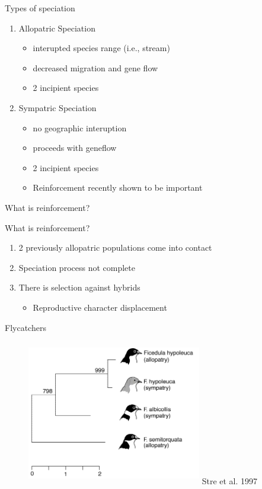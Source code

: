 \documentclass[t,10pt]{beamer}
\begin{document}
\begin{frame}[label={sec:orgheadline17}]{Types of speciation}
\begin{enumerate}
\item Allopatric Speciation
\begin{itemize}
\item interupted species range (i.e., stream)
\item decreased migration and gene flow
\item 2 incipient species \vspace{0.25in}
\end{itemize}
\item Sympatric Speciation
\begin{itemize}
\item no geographic interuption
\item proceeds with geneflow
\item 2 incipient species
\item<2-> \alert{Reinforcement recently shown to be important} \vspace{0.25in}
\end{itemize}
\end{enumerate}
\end{frame}

\begin{frame}[label={sec:orgheadline18}]{What is reinforcement?}
\end{frame}
\begin{frame}[<+->][label={sec:orgheadline19}]{What is reinforcement?}
\begin{enumerate}
\item 2 previously \alert{allopatric} populations come into contact
\item Speciation process not complete
\item There is selection against hybrids
\begin{itemize}
\item Reproductive character displacement
\end{itemize}
\end{enumerate}
\end{frame}


\begin{frame}[label={sec:orgheadline20}]{Flycatchers}
\begin{figure}[htb]
\centering
\includegraphics[width=3in,height=2.5in]{./Figures/FlycatcherPhylogeny.png}
Stre et al. 1997
\end{figure}
\end{frame}
\end{document}
